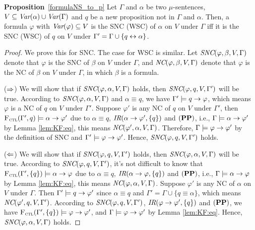 \documentclass[runningheads]{llncs}
\begin{document}
\noindent\textbf{Proposition}~\ref{formulaNS_to_p}  Let $\Gamma$ and $\alpha$ be two $\mu$-sentences, $V \subseteq \textit{Var}(\alpha) \cup \textit{Var}(\Gamma)$  and $q$ be a new proposition not in $\Gamma$ and $\alpha$.
 Then, a formula $\varphi$ with $\textit{Var}(\varphi) \subseteq V$ is the SNC (WSC) of $\alpha$ on $V$ under  $\Gamma$ iff it is the SNC (WSC) of $q$ on $V$ under $\Gamma' = \Gamma \cup \{q \leftrightarrow \alpha\}$.

\begin{proof}
    We prove this for SNC. The case for WSC is similar.
    Let $\emph{SNC}(\varphi,\beta,V,\Gamma)$ denote that $\varphi$ is the SNC of $\beta$ on $V$ under $\Gamma$, and  $\emph{NC}(\varphi,\beta,V,\Gamma)$ denote that $\varphi$ is the NC of $\beta$ on $V$ under $\Gamma$, in which $\beta$ is a formula.

    ($\Rightarrow$) We will show that if $\emph{SNC}(\varphi,\alpha,V,\Gamma)$ holds, then $\emph{SNC}(\varphi,q,V,\Gamma')$ will be true. According to $\emph{SNC}(\varphi,\alpha,V,\Gamma)$ and $\alpha\equiv q$, we have $\Gamma' \models q\rightarrow \varphi$, which means $\varphi$ is a NC of $q$ on $V$ under $\Gamma'$. Suppose $\varphi'$ is any NC of $q$ on $V$ under $\Gamma'$, then ${\textsc{F}_{\textsc{ctl}}}(\Gamma',q)\models \alpha \rightarrow \varphi'$ due to $\alpha\equiv q$, $\emph{IR}(\alpha \rightarrow \varphi', \{q\})$ and $(\textbf{PP})$, i.e., $\Gamma \models \alpha \rightarrow \varphi'$ by Lemma \ref{lem:KF:eq}, this means $\emph{NC}(\varphi',\alpha,V,\Gamma)$. Therefore, $\Gamma \models \varphi \rightarrow \varphi'$ by the definition of SNC and $\Gamma' \models \varphi \rightarrow \varphi'$. Hence, $\emph{SNC}(\varphi,q,V,\Gamma')$ holds.

    ($\Leftarrow$) We will show that if $\emph{SNC}(\varphi,q,V,\Gamma')$ holds, then $\emph{SNC}(\varphi,\alpha,V,\Gamma)$ will be true. According to $\emph{SNC}(\varphi,q,V,\Gamma')$, it's not difficult to know that ${\textsc{F}_{\textsc{ctl}}}(\Gamma', \{q\})\models \alpha \rightarrow \varphi$ due to $\alpha\equiv q$, $\emph{IR}(\alpha \rightarrow \varphi, \{q\})$ and $(\textbf{PP})$, i.e., $\Gamma \models \alpha \rightarrow \varphi$ by Lemma \ref{lem:KF:eq}, this means $\emph{NC}(\varphi,\alpha,V,\Gamma)$. Suppose $\varphi'$ is any NC of $\alpha$ on $V$ under $\Gamma$. Then $\Gamma' \models q \rightarrow \varphi'$ since $\alpha\equiv q$ and $\Gamma'=\Gamma \cup \{q\equiv \alpha\}$, which means $\emph{NC}(\varphi',q,V,\Gamma')$. According to $\emph{SNC}(\varphi,q,V,\Gamma')$, $\emph{IR}(\varphi \rightarrow \varphi', \{q\})$ and $(\textbf{PP})$, we have
    ${\textsc{F}_{\textsc{ctl}}}(\Gamma', \{q\})\models \varphi \rightarrow \varphi'$, and $\Gamma \models \varphi \rightarrow \varphi'$ by Lemma \ref{lem:KF:eq}. Hence, $\emph{SNC}(\varphi,\alpha,V, \Gamma)$ holds.
    \end{proof}
\end{document}
